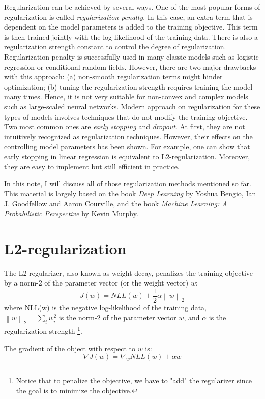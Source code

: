 \documentclass[11pt,letterpaper]{article}
\newcommand\norm[1]{\left\lVert#1\right\rVert}
\begin{document}
Regularization can be achieved by several ways. One of the most popular forms of regularization is called \emph{regularization penalty}.  In this case, an extra term that is dependent on the model parameters  is added to the training objective. This term is then trained jointly with the log likelihood of the training data. There is also a regularization strength constant to control the degree of regularization. Regularization penalty is successfully used in many classic models such as logistic regression or conditional random fields. However, there are two major drawbacks with this approach: (a) non-smooth regularization terms might hinder optimization; (b) tuning the regularization strength requires training the model many times. Hence, it is not very suitable for non-convex and complex models such as large-scaled neural networks. Modern approach on regularization for these types of models involves techniques that do not modify the training objective. Two most common ones are \emph{early stopping} and \emph{dropout}. At first, they are not intuitively recognized as regularization techniques. However, their effects on the controlling model parameters has been shown. For example, one can show that early stopping in linear regression is equivalent to L2-regularization. Moreover, they are easy to implement but still efficient in practice. 

In this note, I will discuss all of those regularization methods mentioned so far. This material is largely based on the book \emph{Deep Learning} by Yoshua Bengio, Ian J. Goodfellow and Aaron Courville, and the book \emph{Machine Learning: A Probabilistic Perspective} by Kevin Murphy. 

\section{L2-regularization}

The L2-regularizer, also known as weight decay, penalizes the training objective by a norm-2 of the parameter vector (or the weight vector) $w$:
$$
J(w) = NLL(w) + \frac{1}{2} \alpha \norm{w}_2
$$ where NLL(w) is the negative log-likelihood of the training data, $\norm{w}_2 = \sum_i w_i^2$ is the norm-2 of the parameter vector $w$, and $\alpha$ is the regularization strength \footnote{Notice that to penalize the objective, we have to "add" the regularizer since the goal is to minimize the objective.}.

The gradient of the object with respect to $w$ is:
\begin{equation}
 \nabla J(w) = \nabla_w NLL(w) + \alpha w
\end{equation}
\end{document}
